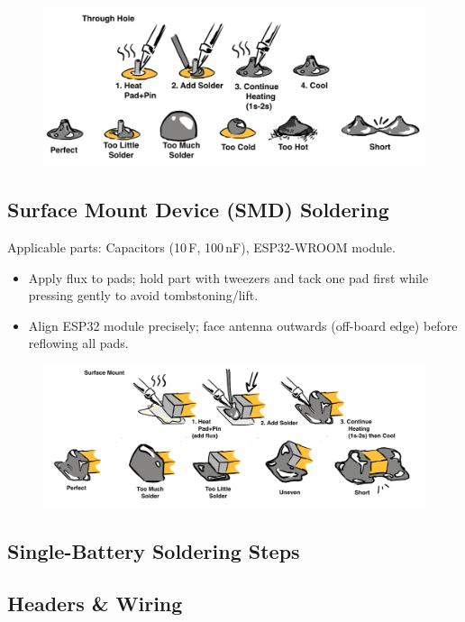 \begin{figure}[h]
  \centering
  \includegraphics[width=0.5\linewidth]{img/manual/solder1.png}
\end{figure}

\subsection*{Surface Mount Device (SMD) Soldering}
Applicable parts: Capacitors (10\,\textmu F, 100\,nF), ESP32-WROOM module.
\begin{itemize}
  \item Apply flux to pads; hold part with tweezers and tack one pad first while pressing gently to avoid tombstoning/lift.
  \item Align ESP32 module precisely; face antenna outwards (off-board edge) before reflowing all pads.
\end{itemize}


\begin{figure}[h]
  \centering
  \includegraphics[width=0.5\linewidth]{img/manual/solder2.png}
\end{figure}

\subsection*{Single-Battery Soldering Steps}
\subsection*{Headers \& Wiring}

